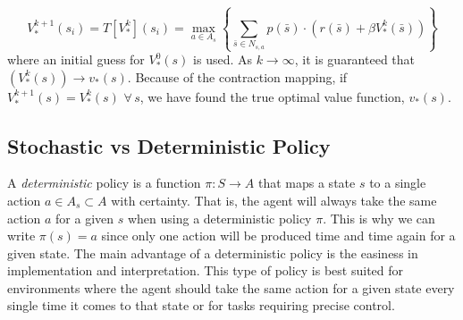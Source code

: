 \begin{equation}
\label{eq:policyiter-val-iteration}
V_{*}^{k+1}(s_i) = T[V_*^k](s_i) = \max_{a \in A_s} \left\{\sum_{\bar{s}\in N_{s,a}}p(\bar{s}) \cdot\left( r(\bar{s}) + \beta V_*^k(\bar{s})\right)\right\}
\end{equation}
where an initial guess for $V_*^0(s)$ is used.
As $k \to \infty$, it is guaranteed that $(V_*^k(s)) \to v_*(s)$.
Because of the contraction mapping, if $V_*^{k+1}(s) = V_*^k(s) \, \, \forall \, s$, we have found the true optimal value function, $v_*(s)$.


\subsection*{Stochastic vs Deterministic Policy}
A \emph{deterministic} policy is a function $\pi: S\to A$ that maps a state $s$ to a single action $a \in A_s\subset A$ with certainty.
That is, the agent will always take the same action $a$ for a given $s$ when using a deterministic policy $\pi$.
This is why we can write $\pi(s)=a$ since only one action will be produced time and time again for a given state.
The main advantage of a deterministic policy is the easiness in implementation and interpretation.
This type of policy is best suited for environments where the agent should take the same action for a given state every single time it comes to that state or for tasks requiring precise control.

